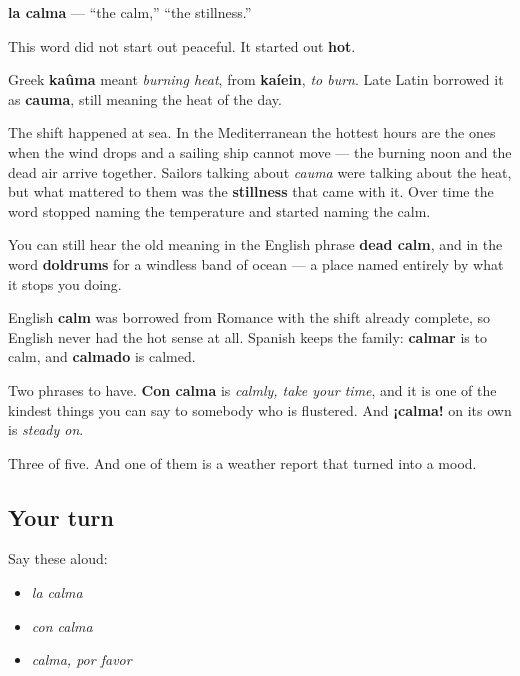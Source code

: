 \begin{cousinweb}
\textbf{la calma} — \textquotedblleft{}the calm,\textquotedblright{} \textquotedblleft{}the stillness.\textquotedblright{}

This word did not start out peaceful. It started out \textbf{hot}.

Greek \textbf{kaûma} meant \emph{burning heat}, from \textbf{kaíein}, \emph{to burn}. Late Latin borrowed it as \textbf{cauma}, still meaning the heat of the day.

The shift happened at sea. In the Mediterranean the hottest hours are the ones when the wind drops and a sailing ship cannot move — the burning noon and the dead air arrive together. Sailors talking about \emph{cauma} were talking about the heat, but what mattered to them was the \textbf{stillness} that came with it. Over time the word stopped naming the temperature and started naming the calm.

You can still hear the old meaning in the English phrase \textbf{dead calm}, and in the word \textbf{doldrums} for a windless band of ocean — a place named entirely by what it stops you doing.

English \textbf{calm} was borrowed from Romance with the shift already complete, so English never had the hot sense at all. Spanish keeps the family: \textbf{calmar} is to calm, and \textbf{calmado} is calmed.

Two phrases to have. \textbf{Con calma} is \emph{calmly, take your time}, and it is one of the kindest things you can say to somebody who is flustered. And \textbf{¡calma!} on its own is \emph{steady on}.
\end{cousinweb}

\begin{grammarlens}[title={What you've built}]
Three of five. And one of them is a weather report that turned into a mood.
\end{grammarlens}

\subsection*{Your turn}
Say these aloud:

\begin{itemize}
\raggedright
  \item \emph{la calma}
  \item \emph{con calma}
  \item \emph{calma, por favor}
\end{itemize}

